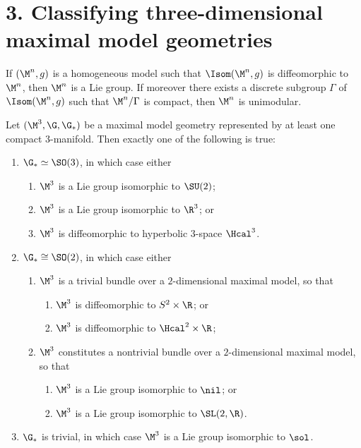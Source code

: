 \section*{3. Classifying three-dimensional maximal model geometries}

\begin{lemma}
\label{ch01-lem-unimodular-lie-group}

If $(\M^n,g)$ is a homogeneous model such that $\Isom(\M^n,g)$ is diffeomorphic to $\M^n$, then $\M^n$ is a Lie group. If moreover there exists a discrete subgroup $\Gamma$ of $\Isom(\M^n,g)$ such that $\M^n/\Gamma$ is compact, then $\M^n$ is unimodular.
\end{lemma}

\begin{proposition}
\label{ch01-prop-classification-maximal-models}

Let $(\M^3,\G,\G_*)$ be a maximal model geometry represented by at least one compact $3$-manifold. Then exactly one of the following is true:
\begin{enumerate}
\item $\G_* \simeq \SO(3)$, in which case either
\begin{enumerate}
\item $\M^3$ is a Lie group isomorphic to $\SU(2)$;
\item $\M^3$ is a Lie group isomorphic to $\R^3$; or
\item $\M^3$ is diffeomorphic to hyperbolic $3$-space $\Hcal^3$.
\end{enumerate}
\item $\G_* \cong \SO(2)$, in which case either
\begin{enumerate}
\item $\M^3$ is a trivial bundle over a $2$-dimensional maximal model, so that
\begin{enumerate}
\item $\M^3$ is diffeomorphic to $S^2 \times \R$; or
\item $\M^3$ is diffeomorphic to $\Hcal^2 \times \R$;
\end{enumerate}
\item $\M^3$ constitutes a nontrivial bundle over a $2$-dimensional maximal model, so that
\begin{enumerate}
\item $\M^3$ is a Lie group isomorphic to $\nil$; or
\item $\M^3$ is a Lie group isomorphic to $\SL(2,\R)$.
\end{enumerate}
\end{enumerate}
\item $\G_*$ is trivial, in which case $\M^3$ is a Lie group isomorphic to $\sol$.
\end{enumerate}
\end{proposition}

